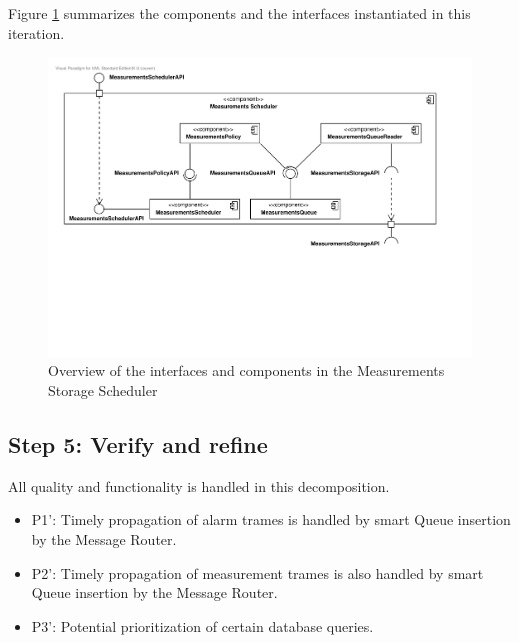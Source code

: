 \npar Figure \ref{fig:it3/interfaces} summarizes the components and the
interfaces instantiated in this iteration.

\begin{figure}[H]
	\begin{centering}
		\includegraphics[width=\textwidth]{figs/add-it3-interfaces.pdf}
		\caption{Overview of the interfaces and components in the Measurements Storage
		Scheduler}
		\label{fig:it3/interfaces}
	\end{centering}
\end{figure}

\subsection{Step 5: Verify and refine}
\label{add:it3/verification}


\npar All quality and functionality is handled in this decomposition.  

\begin{itemize}
	\item P1': Timely propagation of alarm trames is handled by smart Queue
	insertion by the Message Router. 
	\item P2': Timely propagation of measurement trames is also handled by smart
	Queue insertion by the Message Router. 
	\item P3': Potential prioritization of certain database queries. 
\end{itemize}